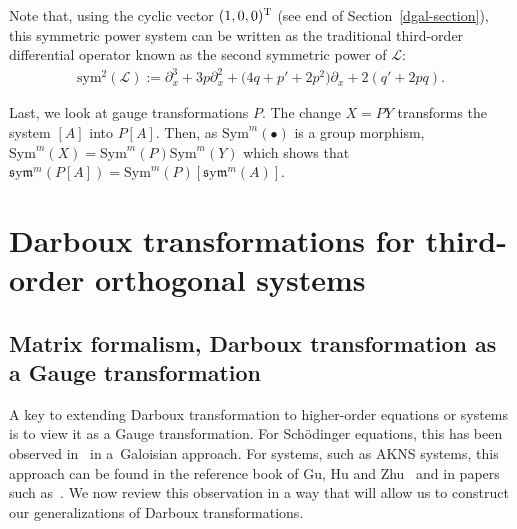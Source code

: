 \documentclass[pdftex]{sigma}%
\numberwithin{equation}{section}
\def\Sym{\mathrm{Sym}}
\def\sym{\mathfrak{s}\mathrm{y}\mathfrak{m}}
\begin{document}
Note that, using the cyclic vector $(1,0,0)^{\rm T}$ (see end of Section~\ref{dgal-section}), this symmetric power system can be written as the traditional third-order differential operator known as the second symmetric power of $\mathcal{L}$:
\begin{gather*}%
\textrm{sym}^2 ( \mathcal{L} ):= \partial_x^3 +3p \partial_x^2 + \big(4q + p' +2p^2\big) \partial_x +2 (q' +2pq).
\end{gather*}

Last, we look at gauge transformations $P$.
The change $X = P Y$ transforms the system $[A]$ into $P[A]$. Then,
as $\Sym^m(\bullet)$ is a group morphism, $\Sym^{m}(X)=\Sym^{m}(P) \Sym^m(Y)$
which shows that $\sym^m (P[A]) = \Sym^{m}(P)[ \sym^m (A)]$.

\section{Darboux transformations for third-order orthogonal systems}

\subsection{Matrix formalism, Darboux transformation as a Gauge transformation}
A key to extending Darboux transformation to higher-order equations or systems is to view it as a Gauge transformation. For Sch\"odinger equations, this has been observed in~\cite{AP2,ac2,AP1} in a~Galoisian approach. For systems, such as AKNS systems, this approach can be found in the reference book of Gu, Hu and Zhu~\cite[Section~1.3, p.~18]{GHZ} and in papers such as~\cite{JiMoSaZu17r,JiMoSaZu18v,JiMoSaZu19f,YaRu13m}.
We now review this observation in a way that will allow us to construct our generalizations of Darboux transformations.
\end{document}
